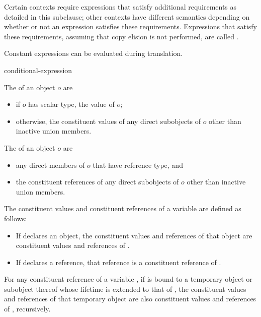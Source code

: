 \documentclass{wg21}
\begin{document}
\pnum
Certain contexts require expressions that satisfy additional
requirements as detailed in this subclause; other contexts have different
semantics depending on whether or not an expression satisfies these requirements.
Expressions that satisfy these requirements,
assuming that copy elision is not performed,
are called
%
.
\begin{note}
    Constant expressions can be evaluated
    during translation.
\end{note}

\begin{bnf}
    \br
    conditional-expression
\end{bnf}


\begin{addedblock}
The  of an object $o$ are
\begin{itemize}
\item if $o$ has scalar type, the value of $o$;
\item otherwise, the constituent values of any direct subobjects of $o$ other
than inactive union members.
\end{itemize}

The  of an object $o$ are
\begin{itemize}
\item any direct members of $o$ that have reference type, and
\item the constituent references of any direct subobjects of $o$ other than
inactive union members.
\end{itemize}
\end{addedblock}


\begin{addedblock}
The constituent values and constituent references of a variable  are defined as follows:
\begin{itemize}
\item If  declares an object, the constituent values and references of that object are
constituent values and references of .
\item If  declares a reference, that reference is a constituent reference of .
\end{itemize}
For any constituent reference  of a variable , if  is bound to a temporary object or
subobject thereof whose lifetime is extended to that of , the constituent values and
references of that temporary object are also constituent values and references of ,
recursively.
\end{addedblock}
\end{document}
